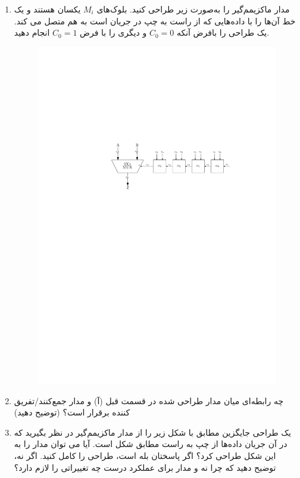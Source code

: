 \begin{enumerate}
	\item 
	مدار ماکزیمم‌گیر را به‌صورت زیر طراحی کنید. بلوک‌های $M_i$ یکسان هستند و یک خط آن‌ها را با داده‌هایی که از راست به چپ در جریان است به هم متصل می کند. یک طراحی را بافرض آنکه $C_0=0$ و دیگری را با فرض $C_0=1$ انجام دهید.
	
	
	\begin{figure}[h]
		\centering
		\includegraphics[width=1\textwidth]{fig/Q_bonus_b.pdf}
		\label{fig:bonus_b}
	\end{figure}
	
	
	
	\item 
	چه رابطه‌ای میان مدار طراحی شده در قسمت قبل (آ) و مدار جمع‌کنند/تفریق کننده برقرار است؟ (توضیح دهید)


	\item 
	یک طراحی جایگزین مطابق با شکل زیر را از مدار ماکزیمم‌گیر در نظر بگیرید که در آن جریان داده‌ها از چپ به راست مطابق شکل است. آیا می توان مدار را به این شکل طراحی کرد؟ اگر پاسختان بله است، طراحی را کامل کنید. اگر نه، توضیح دهید که چرا نه و مدار برای عملکرد درست چه تغییراتی را لازم دارد؟
	

\end{enumerate}
